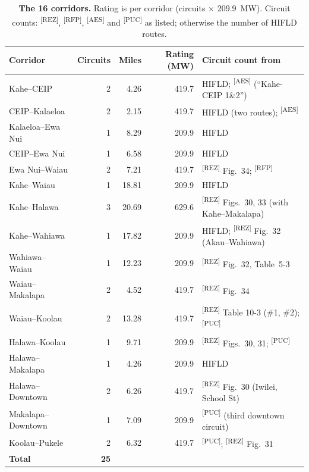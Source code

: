\documentclass[11pt,a4paper]{article}
\newcommand{\src}[1]{\textsuperscript{[#1]}}
\begin{document}
\begin{table}[!htbp]
\centering
\small
\caption{\textbf{The 16 corridors.} Rating is per corridor (circuits $\times$
\SI{209.9}{MW}). Circuit counts: \src{REZ}, \src{RFP}, \src{AES} and \src{PUC} as
listed; otherwise the number of HIFLD routes.}
\label{tab:lines}
\begin{tabular}{@{}lrrrl@{}}
\toprule
\textbf{Corridor} & \textbf{Circuits} & \textbf{Miles} & \textbf{Rating (MW)} &
  \textbf{Circuit count from} \\
\midrule
Kahe--CEIP           & 2 & 4.26  & 419.7 & HIFLD; \src{AES} (``Kahe-CEIP 1\&2'') \\
CEIP--Kalaeloa       & 2 & 2.15  & 419.7 & HIFLD (two routes); \src{AES} \\
Kalaeloa--Ewa Nui    & 1 & 8.29  & 209.9 & HIFLD \\
CEIP--Ewa Nui        & 1 & 6.58  & 209.9 & HIFLD \\
Ewa Nui--Waiau       & 2 & 7.21  & 419.7 & \src{REZ} Fig.~34; \src{RFP} \\
Kahe--Waiau          & 1 & 18.81 & 209.9 & HIFLD \\
Kahe--Halawa         & 3 & 20.69 & 629.6 & \src{REZ} Figs.~30, 33 (with Kahe--Makalapa) \\
Kahe--Wahiawa        & 1 & 17.82 & 209.9 & HIFLD; \src{REZ} Fig.~32 (Akau--Wahiawa) \\
Wahiawa--Waiau       & 1 & 12.23 & 209.9 & \src{REZ} Fig.~32, Table~5-3 \\
Waiau--Makalapa      & 2 & 4.52  & 419.7 & \src{REZ} Fig.~34 \\
Waiau--Koolau        & 2 & 13.28 & 419.7 & \src{REZ} Table 10-3 (\#1, \#2); \src{PUC} \\
Halawa--Koolau       & 1 & 9.71  & 209.9 & \src{REZ} Figs.~30, 31; \src{PUC} \\
Halawa--Makalapa     & 1 & 4.26  & 209.9 & HIFLD \\
Halawa--Downtown     & 2 & 6.26  & 419.7 & \src{REZ} Fig.~30 (Iwilei, School St) \\
Makalapa--Downtown   & 1 & 7.09  & 209.9 & \src{PUC} (third downtown circuit) \\
Koolau--Pukele       & 2 & 6.32  & 419.7 & \src{PUC}; \src{REZ} Fig.~31 \\
\midrule
\textbf{Total} & \textbf{25} & & & \\
\bottomrule
\end{tabular}
\end{table}
\end{document}
